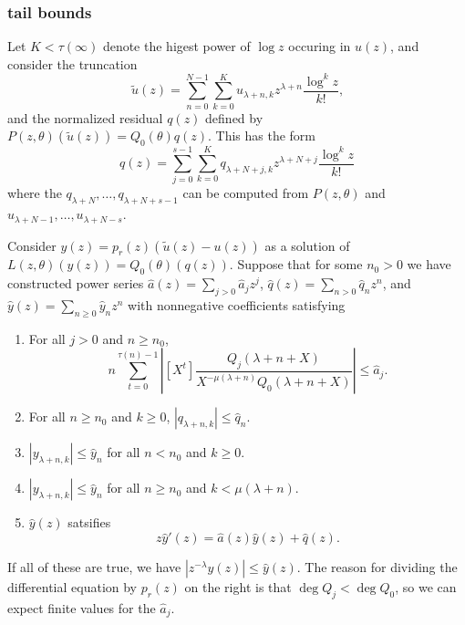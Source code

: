 \documentclass[12pt]{article}
\numberwithin{equation}{section}
\begin{document}
\subsubsection{tail bounds}
Let $K < \tau(\infty)$ denote the higest power of $\log z$ occuring in $u(z)$, and consider the truncation
\begin{equation*}
\tilde{u}(z) = \sum_{n=0}^{N-1} \sum_{k=0}^{K} u_{\lambda + n,k} z^{\lambda + n} \frac{\log^k z}{k!}\text{,}
\end{equation*}
and the normalized residual $q(z)$ defined by $P(z,\theta)(\tilde{u}(z)) = Q_0(\theta) q(z)$. This has the form
\begin{equation*}
q(z) = \sum_{j=0}^{s-1} \sum_{k = 0}^{K} q_{\lambda + N + j, k} z^{\lambda + N + j} \frac{\log^k z}{k!}
\end{equation*}
where the $q_{\lambda+N}, \dots, q_{\lambda+N+s-1}$ can be computed from $P(z,\theta)$ and $u_{\lambda+N-1}, \dots, u_{\lambda+N-s}$.

Consider
$y(z) = p_r(z)(\tilde{u}(z) - u(z))$ as a solution of $L(z, \theta)(y(z)) = Q_0(\theta)(q(z))$. Suppose that for some $n_0 > 0$ we have constructed power series $\hat{a}(z) = \sum_{j>0} \hat{a}_j z^j$, $\hat{q}(z)  = \sum_{n>0} \hat{q}_n z^n$, and $\hat{y}(z) = \sum_{n \ge 0} \hat{y}_n z^n$ with nonnegative coefficients satisfying
\begin{enumerate}
\item For all $j > 0$ and $n \ge n_0$,
\begin{equation*}
n \sum_{t=0}^{\tau(n) - 1} \left| [X^t] \frac{Q_j(\lambda+n+X)}{X^{-\mu(\lambda+n)}Q_0(\lambda+n+X)} \right| \le  \hat{a}_j \text{.}
\end{equation*}
\item For all $n \ge n_0$ and $k \ge 0$, $| q_{\lambda+n,k}| \le \hat{q}_n$.
\item $|y_{\lambda+n,k}| \le \hat{y}_n$ for all $n < n_0$ and $k \ge 0$.
\item $|y_{\lambda+n,k}| \le \hat{y}_n$ for all $n \ge n_0$ and $k < \mu(\lambda + n)$.
\item $\hat{y}(z)$ satsifies
\begin{equation*}
z \hat{y}'(z) = \hat{a}(z) \hat{y}(z) + \hat{q}(z)\text{.}
\end{equation*}
\end{enumerate}
If all of these are true, we have $|z^{-\lambda} y(z)| \le \hat{y}(z)$. The reason for dividing the differential equation by $p_r(z)$ on the right is that $\deg Q_j < \deg Q_0$, so we can expect finite values for the $\hat{a}_j$.
\end{document}
